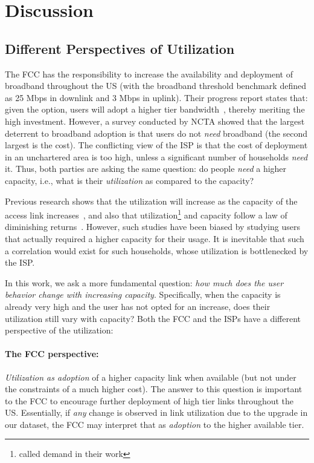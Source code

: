 \section{Discussion}\label{sec:discussion}

\subsection{Different Perspectives of Utilization}

The FCC has the responsibility to increase the availability and deployment of broadband
throughout the US (with the broadband threshold benchmark defined as 25 Mbps in downlink and
3 Mbps in uplink). Their progress report states that: given the option, users will adopt a
higher tier bandwidth~\cite{}, thereby meriting the high investment. However, a survey
conducted by NCTA showed that the largest deterrent to broadband adoption is that users
do not \emph{need} broadband (the second largest is the cost). The conflicting view of 
the ISP is that the cost of deployment in an unchartered area is too high, unless
a significant number of households \emph{need} it. Thus, both parties are asking the same
question: do people \emph{need} a higher capacity, i.e., what is their \emph{utilization}
as compared to the capacity?

Previous research shows that the utilization will increase as the capacity of the access
link increases~\cite{}, and also that utilization\footnote{called demand in their work} and capacity
follow a law of diminishing returns~\cite{bischof2014broadband-behavior}. However, such
studies have been biased by studying users that actually required a higher capacity
for their usage. It is inevitable that such a correlation would exist for 
such households, whose utilization is bottlenecked by the ISP.

In this work, we ask a more fundamental question: \emph{how much does the user behavior
change with increasing capacity}. Specifically, when the capacity is already very high
and the user has not opted for an increase, does their utilization still vary with capacity?
Both the FCC and the ISPs have a different perspective of the utilization:

\paragraph{The FCC perspective: }\emph{Utilization as adoption} of a higher capacity
link when available (but not under the constraints of a much higher cost). The answer to this
question is important to the FCC to encourage further deployment of high tier links throughout
the US. Essentially, if \emph{any} change is observed in link utilization due to the upgrade in our dataset, the FCC may interpret that as \emph{adoption} to the higher available tier.

